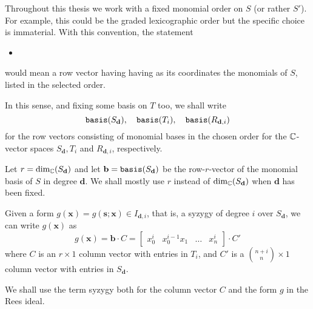 \documentclass[fleqn,reqno]{amsart}
\begin{document}
\begin{paragraf}
\label{par:basis}
Throughout this thesis we work with a fixed monomial order on $S$ (or rather $S'$).
For example, this could be the graded lexicographic order but the specific choice
is immaterial. With this convention, the statement
\begin{itemize}
\item[]
\end{itemize}
would mean a row vector having having as its coordinates the monomials of $S$,
listed in the selected order.

In this sense, and fixing some basis on $T$ too, we shall write
\[
\mathop{\tt basis}(S_{\mathbf d}),\quad\mathop{\tt basis}(T_i),\quad\mathop{\tt basis}(R_{\mathbf d,i})
\]
for the row vectors consisting of monomial bases in the chosen order for the $\mathbb{C}$-vector spaces
$S_{\mathbf d}, T_i$  and $R_{\mathbf d,i}$, respectively.
\end{paragraf}

\begin{paragraf}
\label{par:syzygies}
Let $r=\dim_{\mathbb{C}}(S_{\mathbf d})$ and
let $\mathbf b=\mathop{\tt basis}(S_{\mathbf d})$ be the row-$r$-vector of the monomial basis of $S$ in degree $\mathbf d$.
We shall mostly use $r$ instead of $\dim_{\mathbb{C}}(S_{\mathbf d})$ when $\mathbf d$ has been fixed.

Given a form $g(\mathbf x)=g(\mathbf s;\mathbf x)\in I_{\mathbf d,i}$,
that is, a syzygy of degree $i$ over $S_{\mathbf d}$,
we can write $g(\mathbf x)$ as
\[
g(\mathbf x)=\mathbf b\cdot C=
\begin{bmatrix}
	x_0^i& x_0^{i-1}x_1& \ldots& x_n^i
\end{bmatrix}\cdot C'
\]
where $C$ is an $r\times1$ column vector with entries in $T_i$,
and $C'$ is a $\binom{n+i}{n}\times1$ column vector with entries in $S_{\mathbf d}$.

We shall use the term syzygy both for the column vector $C$ and the form $g$ in the
Rees ideal.
\end{paragraf}
\end{document}
